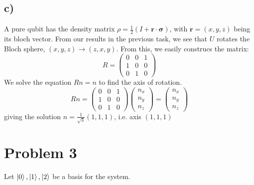 \documentclass[11pt,a4paper]{article}
\begin{document}
\subsection*{c)}
A pure qubit has the density matrix $\rho = \frac{1}{2}\left(I+\boldsymbol{r}\cdot \boldsymbol{\sigma}\right)$, with $\boldsymbol{r} = \left(x,y,z\right)$ being its bloch vector.
From our results in the previous task, we see that $U$ rotates the Bloch sphere, $\left(x,y,z\right) \rightarrow \left(z,x,y\right)$. From this, we easily construcs the matrix:
\begin{equation}
    R = 
    \left(
    \begin{matrix}
        0&0&1 \\ 1&0&0 \\ 0&1&0
    \end{matrix}
    \right)
\end{equation}
We solve the equation $Rn = n$ to find the axis of rotation. 
\begin{equation}
    Rn = 
    \left(
    \begin{matrix}
        0&0&1 \\ 1&0&0 \\ 0&1&0
    \end{matrix}
    \right)
    \left(
        \begin{matrix}
            n_x \\ n_y \\ n_z
        \end{matrix}
    \right)
    =
    \left(
        \begin{matrix}
            n_x \\ n_y \\ n_z
        \end{matrix}
    \right)
\end{equation}
giving the solution $n = \frac{1}{\sqrt{3}}\left(1,1,1\right)$, i.e. axis $\left(1,1,1\right)$
\section*{Problem 3}
Let $\ket{0}, \ket{1},\ket{2}$ be a basis for the system.
\end{document}

